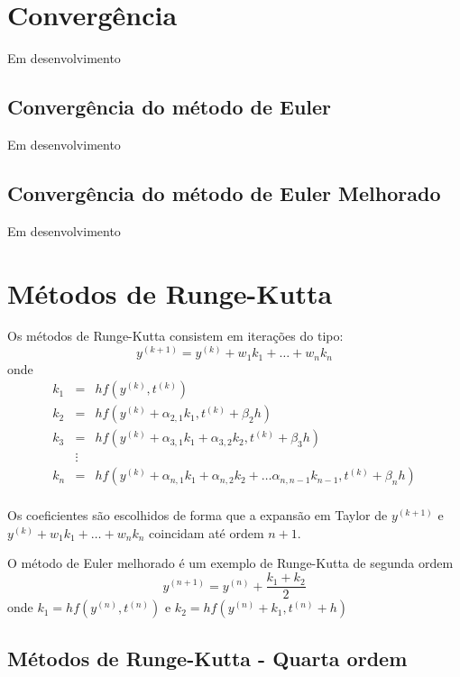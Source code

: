 \section{Convergência}
Em desenvolvimento
\subsection{Convergência do método de Euler}\label{sec_conv_Euler}
Em desenvolvimento
\subsection{Convergência do método de Euler Melhorado}
Em desenvolvimento
\section{Métodos de Runge-Kutta}\label{sec_RK}

Os métodos de Runge-Kutta consistem em iterações do tipo:
$$y^{(k+1)}=y^{(k)}+w_1 k_1 + \ldots + w_n k_n$$
onde
\begin{eqnarray*}
k_1&=&hf(y^{(k)},t^{(k)})\\
k_2&=&hf(y^{(k)}+\alpha_{2,1}k_1,t^{(k)}+\beta_{2}h)\\
k_3&=&hf(y^{(k)}+\alpha_{3,1}k_1+\alpha_{3,2}k_2,t^{(k)}+\beta_{3}h)\\
&\vdots&\\
k_n&=&hf(y^{(k)}+\alpha_{n,1}k_1+\alpha_{n,2}k_2+\ldots \alpha_{n,n-1}k_{n-1},t^{(k)}+\beta_{n}h)\\
\end{eqnarray*}

Os coeficientes são escolhidos de forma que a expansão em Taylor de $y^{(k+1)}$ e $y^{(k)}+w_1 k_1 + \ldots + w_n k_n$ coincidam até ordem $n+1$.

\begin{ex} O método de Euler melhorado é um exemplo de Runge-Kutta de segunda ordem
$$y^{(n+1)}=y^{(n)}+\frac{k_1+k_2}{2}$$
onde $k_1=hf(y^{(n)},t^{(n)})$ e $k_2=hf(y^{(n)}+k_1,t^{(n)}+h)$
\end{ex}

\subsection{Métodos de Runge-Kutta - Quarta ordem}

